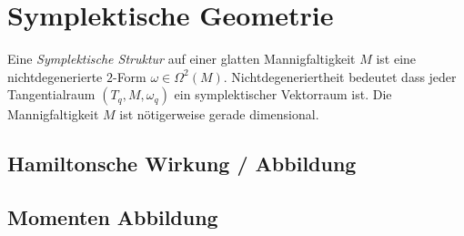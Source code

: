 \chapter{Symplektische Geometrie}
\begin{comment}
Siehe
\begin{itemize}
\item Eilenberg.pdf
\end{itemize}
TODO:
\begin{itemize}
\item symplektische Struktur
\item hamiltonsche Wirkung / Abbildung \cite[p161ff]{mcduff1998introduction}
\item momenten Abbildung \cite[p164ff]{mcduff1998introduction}
\item symplektische quotienten
\begin{itemize}
  \item \cite[Section 5.4]{mcduff1998introduction}
  \item Part IX aus 
    \textbf{[Ana Cannas da Silva] Lectures on Symplectic Geometry}
\end{itemize}
\end{itemize}
\textbf{Es muss Lie (teilweise) vor Symplektische Geometrie!}
\end{comment}

Eine \emph{Symplektische Struktur} auf einer glatten Mannigfaltigkeit $M$ ist
eine nichtdegenerierte $2$-Form $\omega\in\Omega^2(M)$.
Nichtdegeneriertheit bedeutet dass jeder Tangentialraum $(T_q,M,\omega_q)$ ein
symplektischer Vektorraum ist.
Die Mannigfaltigkeit $M$ ist nötigerweise gerade dimensional.
\begin{comment}
Nach \cite[Corollary 2.5]{mcduff1998introduction} gilt, dass das $n$-fache
Wedge Produkt $\omega \wedge\dots\wedge\omega$ nicht verschwindet. Damit ist
$M$ orientierbar.
\end{comment}
\section{Hamiltonsche Wirkung / Abbildung}
\section{Momenten Abbildung}
\begin{comment}
The concept of a moment map is a generalization of that of a hamiltonian
function. The notion of a moment map associated to a group action on a
symplectic manifold formalizes the Noether principle, which states that to
every symmetry (such as a group action) in a mechanical system, there
corresponds a conserved quantity.
\\
Aus p127 
\textbf{[Ana Cannas da Silva] Lectures on Symplectic Geometry}
\end{comment}

%
